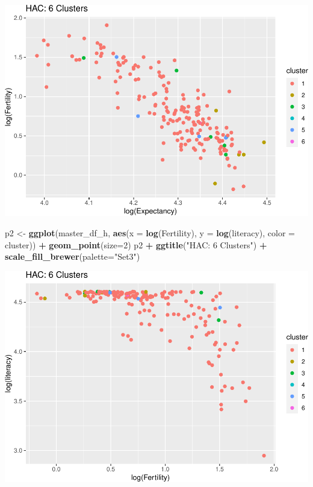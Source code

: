 \documentclass[]{article}
\newenvironment{Shaded}{\begin{snugshade}}{\end{snugshade}}
\newcommand{\DataTypeTok}[1]{\textcolor[rgb]{0.13,0.29,0.53}{#1}}
\newcommand{\DecValTok}[1]{\textcolor[rgb]{0.00,0.00,0.81}{#1}}
\newcommand{\KeywordTok}[1]{\textcolor[rgb]{0.13,0.29,0.53}{\textbf{#1}}}
\newcommand{\NormalTok}[1]{#1}
\newcommand{\OperatorTok}[1]{\textcolor[rgb]{0.81,0.36,0.00}{\textbf{#1}}}
\newcommand{\StringTok}[1]{\textcolor[rgb]{0.31,0.60,0.02}{#1}}
\begin{document}
\includegraphics{eda_files/figure-latex/unnamed-chunk-27-8.pdf}

\begin{Shaded}
\begin{Highlighting}[]
\NormalTok{p2 <-}\StringTok{ }\KeywordTok{ggplot}\NormalTok{(master_df_h, }\KeywordTok{aes}\NormalTok{(}\DataTypeTok{x =} \KeywordTok{log}\NormalTok{(Fertility), }\DataTypeTok{y =} \KeywordTok{log}\NormalTok{(literacy), }\DataTypeTok{color =}\NormalTok{ cluster)) }\OperatorTok{+}
\StringTok{  }\KeywordTok{geom_point}\NormalTok{(}\DataTypeTok{size=}\DecValTok{2}\NormalTok{)}
\NormalTok{p2 }\OperatorTok{+}\StringTok{ }\KeywordTok{ggtitle}\NormalTok{(}\StringTok{"HAC: 6 Clusters"}\NormalTok{) }\OperatorTok{+}\StringTok{ }\KeywordTok{scale_fill_brewer}\NormalTok{(}\DataTypeTok{palette=}\StringTok{"Set3"}\NormalTok{)}
\end{Highlighting}
\end{Shaded}

\includegraphics{eda_files/figure-latex/unnamed-chunk-27-9.pdf}
\end{document}
